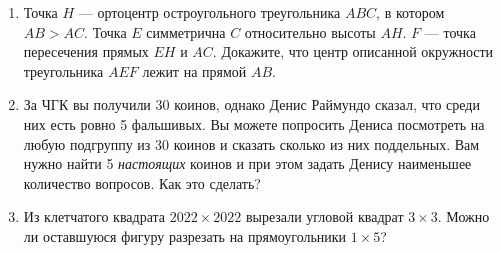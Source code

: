 \documentclass{article}
\begin{document}
\begin{enumerate}[label*=\arabic{enumi}.]
        \item Точка $H$ — ортоцентр остроугольного треугольника $ABC$, в котором $AB > AC$.
        Точка $E$ симметрична $C$ относительно высоты $AH$. $F$ — точка пересечения прямых $EH$ и $AC$.
        Докажите, что центр описанной окружности треугольника $AEF$ лежит на прямой $AB$.

        \item За ЧГК вы получили 30 коинов, однако Денис Раймундо сказал, что среди них есть ровно 5 фальшивых.
        Вы можете попросить Дениса посмотреть на любую подгруппу из 30 коинов и сказать сколько из них поддельных.
        Вам нужно найти 5 \textit{настоящих} коинов и при этом задать Денису наименьшее количество вопросов.
        Как это сделать?

        \item Из клетчатого квадрата $2022 \times 2022$ вырезали угловой квадрат $3 \times 3$.
        Можно ли оставшуюся фигуру разрезать на прямоугольники $1 \times 5$?

    \end{enumerate}
\end{document}
